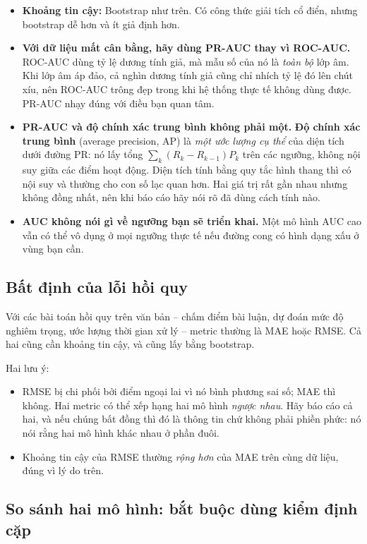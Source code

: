 \begin{itemize}
	\item \textbf{Khoảng tin cậy:} Bootstrap như trên. Có công thức giải tích cổ điển, nhưng bootstrap dễ hơn và ít giả định hơn.
	\item \textbf{Với dữ liệu mất cân bằng, hãy dùng PR-AUC thay vì ROC-AUC.} ROC-AUC dùng tỷ lệ dương tính giả, mà mẫu số của nó là \emph{toàn bộ} lớp âm. Khi lớp âm áp đảo, cả nghìn dương tính giả cũng chỉ nhích tỷ lệ đó lên chút xíu, nên ROC-AUC trông đẹp trong khi hệ thống thực tế không dùng được. PR-AUC nhạy đúng với điều bạn quan tâm.
	\item \textbf{PR-AUC và độ chính xác trung bình không phải một.} \textbf{Độ chính xác trung bình} (average precision, AP) là \emph{một ước lượng cụ thể} của diện tích dưới đường PR: nó lấy tổng $\sum_k (R_k - R_{k-1}) P_k$ trên các ngưỡng, không nội suy giữa các điểm hoạt động. Diện tích tính bằng quy tắc hình thang thì có nội suy và thường cho con số lạc quan hơn. Hai giá trị rất gần nhau nhưng không đồng nhất, nên khi báo cáo hãy nói rõ đã dùng cách tính nào.
	\item \textbf{AUC không nói gì về ngưỡng bạn sẽ triển khai.} Một mô hình AUC cao vẫn có thể vô dụng ở mọi ngưỡng thực tế nếu đường cong có hình dạng xấu ở vùng bạn cần.
\end{itemize}

\subsection{Bất định của lỗi hồi quy}
\label{ssec:regression_uncertainty}

Với các bài toán hồi quy trên văn bản -- chấm điểm bài luận, dự đoán mức độ nghiêm trọng, ước lượng thời gian xử lý -- metric thường là MAE hoặc RMSE. Cả hai cũng cần khoảng tin cậy, và cũng lấy bằng bootstrap.

Hai lưu ý:
\begin{itemize}
	\item RMSE bị chi phối bởi điểm ngoại lai vì nó bình phương sai số; MAE thì không. Hai metric có thể xếp hạng hai mô hình \emph{ngược nhau}. Hãy báo cáo cả hai, và nếu chúng bất đồng thì đó là thông tin chứ không phải phiền phức: nó nói rằng hai mô hình khác nhau ở phần đuôi.
	\item Khoảng tin cậy của RMSE thường \emph{rộng hơn} của MAE trên cùng dữ liệu, đúng vì lý do trên.
\end{itemize}

\subsection{So sánh hai mô hình: bắt buộc dùng kiểm định cặp}
\label{ssec:paired_comparison}

